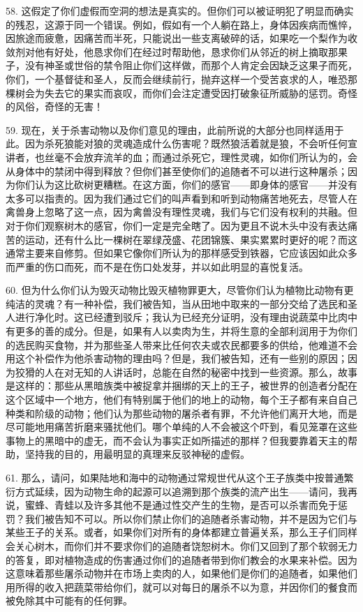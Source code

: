 58. 这假定了你们虚假而空洞的想法是真实的。但你们可以被证明犯了明显而确实的残忍，这源于同一个错误。例如，假如有一个人躺在路上，身体因疾病而憔悴，因旅途而疲惫，因痛苦而半死，只能说出一些支离破碎的话，如果吃一个梨作为收敛剂对他有好处，他恳求你们在经过时帮助他，恳求你们从邻近的树上摘取那果子，没有神圣或世俗的禁令阻止你们这样做，而那个人肯定会因缺乏这果子而死，你们，一个基督徒和圣人，反而会继续前行，抛弃这样一个受苦哀求的人，唯恐那棵树会为失去它的果实而哀叹，而你们会注定遭受因打破象征所威胁的惩罚。奇怪的风俗，奇怪的无害！\par

59. 现在，关于杀害动物以及你们意见的理由，此前所说的大部分也同样适用于此。因为杀死狼能对狼的灵魂造成什么伤害呢？既然狼活着就是狼，不会听任何宣讲者，也丝毫不会放弃流羊的血；而通过杀死它，理性灵魂，如你们所认为的，会从身体中的禁闭中得到释放？但你们甚至使你们的追随者不可以进行这种屠杀；因为你们认为这比砍树更糟糕。在这方面，你们的感官——即身体的感官——并没有太多可以指责的。因为我们通过它们的叫声看到和听到动物痛苦地死去，尽管人在禽兽身上忽略了这一点，因为禽兽没有理性灵魂，我们与它们没有权利的共融。但对于你们观察树木的感官，你们一定是完全瞎了。因为更且不说木头中没有表达痛苦的运动，还有什么比一棵树在翠绿茂盛、花团锦簇、果实累累时更好的呢？而这通常主要来自修剪。但如果它像你们所认为的那样感受到铁器，它应该因如此众多而严重的伤口而死，而不是在伤口处发芽，并以如此明显的喜悦复活。\par

60. 但为什么你们认为毁灭动物比毁灭植物罪更大，尽管你们认为植物比动物有更纯洁的灵魂？有一种补偿，我们被告知，当从田地中取来的一部分交给了选民和圣人进行净化时。这已经遭到驳斥；我认为已经充分证明，没有理由说蔬菜中比肉中有更多的善的成分。但是，如果有人以卖肉为生，并将生意的全部利润用于为你们的选民购买食物，并为那些圣人带来比任何农夫或农民都要多的供给，他难道不会用这个补偿作为他杀害动物的理由吗？但是，我们被告知，还有一些别的原因；因为狡猾的人在对无知的人讲话时，总能在自然的秘密中找到一些资源。那么，故事是这样的：那些从黑暗族类中被捉拿并捆绑的天上的王子，被世界的创造者分配在这个区域中一个地方，他们有特别属于他们的地上的动物，每个王子都有来自自己种类和阶级的动物；他们认为那些动物的屠杀者有罪，不允许他们离开大地，而是尽可能地用痛苦折磨来骚扰他们。哪个单纯的人不会被这个吓到，看见笼罩在这些事物上的黑暗中的虚无，而不会认为事实正如所描述的那样？但我要靠着天主的帮助，坚持我的目的，用最明显的真理来反驳神秘的虚假。\par

61. 那么，请问，如果陆地和海中的动物通过常规世代从这个王子族类中按普通繁衍方式延续，因为动物生命的起源可以追溯到那个族类的流产出生——请问，我再说，蜜蜂、青蛙以及许多其他不是通过性交产生的生物，是否可以杀害而免于惩罚？我们被告知不可以。所以你们禁止你们的追随者杀害动物，并不是因为它们与某些王子的关系。或者，如果你们对所有的身体都建立普遍关系，那么王子们同样会关心树木，而你们并不要求你们的追随者饶恕树木。你们又回到了那个软弱无力的答复，即对植物造成的伤害通过你们的追随者带到你们教会的水果来补偿。因为这意味着那些屠杀动物并在市场上卖肉的人，如果他们是你们的追随者，如果他们用所得的收入把蔬菜带给你们，就可以对每日的屠杀不以为意，并因你们的餐食而被免除其中可能有的任何罪。\par

